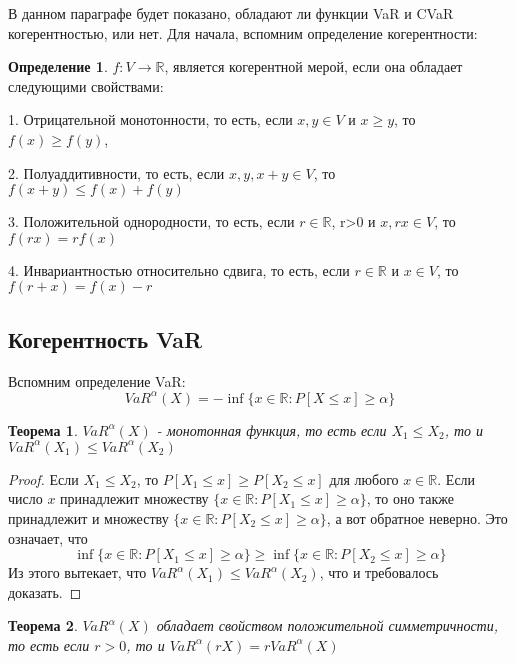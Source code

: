 \documentclass[14pt,a4paper]{article}
\theoremstyle{plain}
\newtheorem{Th}{Теорема}[section]
\theoremstyle{definition}
\newtheorem{Def}{Определение}[section]
\begin{document}
В данном параграфе будет показано, обладают ли функции VaR и CVaR когерентностью, или нет.
Для начала, вспомним определение когерентности:
\vspace{1pc}
\begin{Def} \label{main}
$f:V \rightarrow \mathbb{R}$, является когерентной мерой, если она обладает следующими свойствами:

1. Отрицательной монотонности, то есть, если $x,y \in V$ и $x\ge y$, то $f(x) \ge f(y)$,

2. Полуаддитивности, то есть, если $x,y,x+y \in V$, то $f(x+y) \le f(x) + f(y)$

3. Положительной однородности, то есть, если $r \in \mathbb{R}$, r>0 и $x, rx \in V$, то $f(rx) = rf(x)$

4. Инвариантностью относительно сдвига, то есть, если  $r \in \mathbb{R}$ и $x \in V$, то $f(r+x) = f(x) - r$

\end{Def}
\vspace{1pc}
 \subsection{Когерентность VaR}

Вспомним определение VaR:
$$
VaR^\alpha(X) = -\inf\{x\in \mathbb{R} : P[X \le x] \ge \alpha\}
$$

\begin{Th} \label{main} $VaR^\alpha(X)$ - монотонная функция, то есть если $ X_1 \le X_2$, то и $ VaR^\alpha(X_1) \le VaR^\alpha(X_2)$
\end{Th}

\begin{proof}
Если $X_1\le X_2$, то $P[X_1 \le x] \ge P[X_2 \le x]$ для любого $x \in \mathbb{R}$. Если число $x$ принадлежит множеству $\{x\in \mathbb{R} : P[X_1 \le x] \ge \alpha\}$, то оно также принадлежит и множеству $\{x\in \mathbb{R} : P[X_2 \le x] \ge \alpha\}$, а вот обратное неверно. Это означает, что
$$
\inf\{x\in \mathbb{R} : P[X_1 \le x] \ge \alpha\} \ge \inf\{x\in \mathbb{R} : P[X_2 \le x] \ge \alpha\}
$$
Из этого вытекает, что $VaR^\alpha(X_1) \le VaR^\alpha(X_2)$, что и требовалось доказать.
\end{proof}

\begin{Th} \label{main} $VaR^\alpha(X)$ обладает свойством положительной симметричности, то есть если $ r >0$, то и $ VaR^\alpha(rX) =r VaR^\alpha(X)$
\end{Th}
\end{document}
